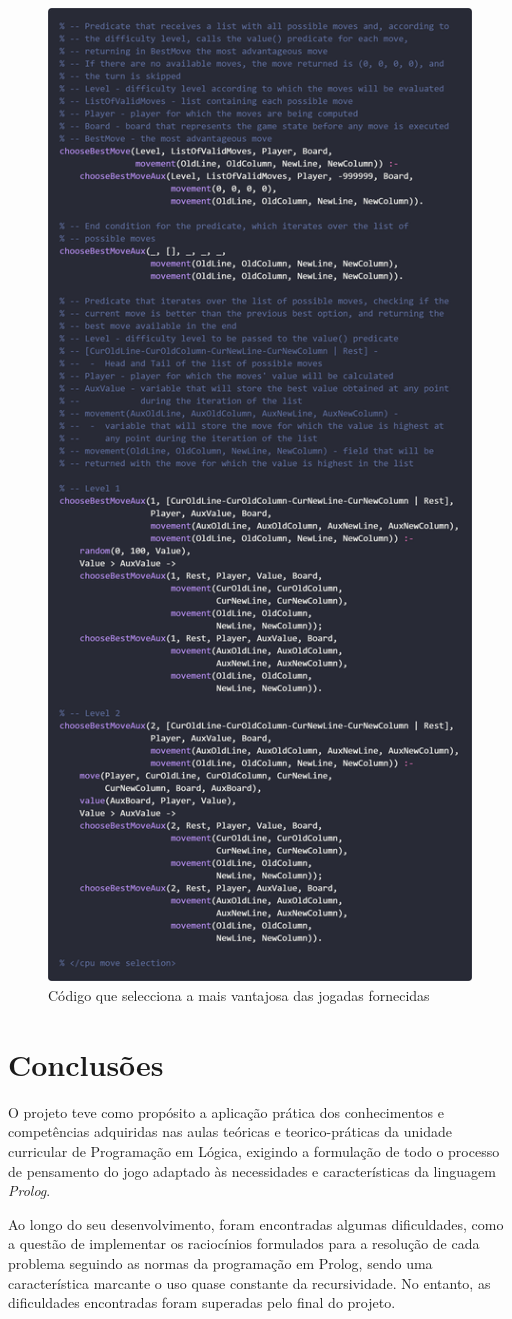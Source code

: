 \documentclass[a4paper]{article}
\begin{document}
\newpage
\begin{figure}[hbp!]
    \centering
    \includegraphics[width=.593\linewidth]{prints/move-selection-2.png}
    \caption{Código que selecciona a mais vantajosa das jogadas fornecidas}
    \label{fig}
\end{figure}

\newpage\section{Conclusões}

\bigskip
O projeto teve como propósito a aplicação prática dos conhecimentos e competências adquiridas nas aulas teóricas e teorico-práticas da unidade curricular de Programação em Lógica, exigindo a formulação de todo o processo de pensamento do jogo adaptado às necessidades e características da linguagem \textit{Prolog}.

\bigskip
Ao longo do seu desenvolvimento, foram encontradas algumas dificuldades, como a questão de implementar os raciocínios formulados para a resolução de cada problema seguindo as normas da programação em Prolog, sendo uma característica marcante o uso quase constante da recursividade. No entanto, as dificuldades encontradas foram superadas pelo final do projeto.
\end{document}
